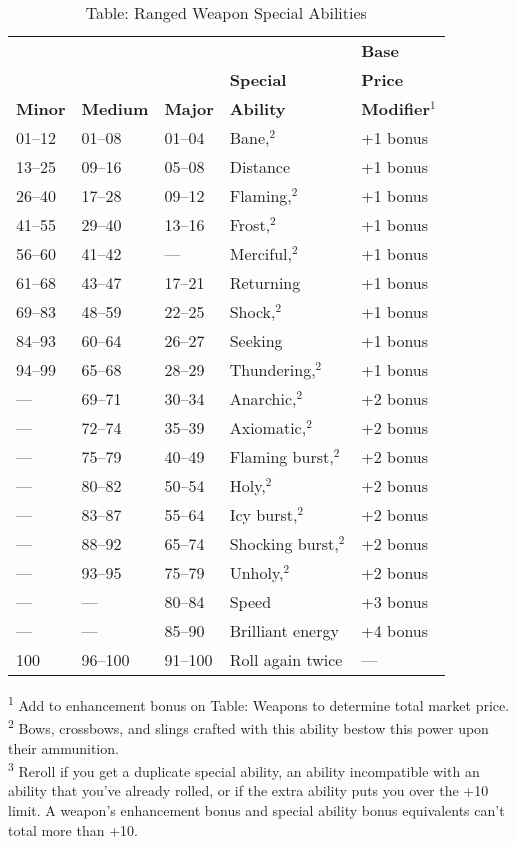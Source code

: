 \begin{table}[]
\sffamily
\caption{Table: Ranged Weapon Special Abilities}
\setlength{\tabcolsep}{1pt}
\begin{tabular}{lllll}
               &                 &                &                  & \textbf{Base} \\
               &                 &                & \textbf{Special} & \textbf{Price} \\
\textbf{Minor} & \textbf{Medium} & \textbf{Major} & \textbf{Ability} & \textbf{Modifier\(^{1}\)}\\
01--12 & 01--08 & 01--04 & Bane,\(^{2}\) & +1 bonus\\
13--25 & 09--16 & 05--08 & Distance & +1 bonus\\
26--40 & 17--28 & 09--12 & Flaming,\(^{2}\) & +1 bonus\\
41--55 & 29--40 & 13--16 & Frost,\(^{2}\) & +1 bonus\\
56--60 & 41--42 & --- & Merciful,\(^{2}\) & +1 bonus\\
61--68 & 43--47 & 17--21 & Returning & +1 bonus\\
69--83 & 48--59 & 22--25 & Shock,\(^{2}\) & +1 bonus\\
84--93 & 60--64 & 26--27 & Seeking & +1 bonus\\
94--99 & 65--68 & 28--29 & Thundering,\(^{2}\) & +1 bonus\\
--- & 69--71 & 30--34 & Anarchic,\(^{2}\) & +2 bonus\\
--- & 72--74 & 35--39 & Axiomatic,\(^{2}\) & +2 bonus\\
--- & 75--79 & 40--49 & Flaming burst,\(^{2}\) & +2 bonus\\
--- & 80--82 & 50--54 & Holy,\(^{2}\) & +2 bonus\\
--- & 83--87 & 55--64 & Icy burst,\(^{2}\) & +2 bonus\\
--- & 88--92 & 65--74 & Shocking burst,\(^{2}\) & +2 bonus\\
--- & 93--95 & 75--79 & Unholy,\(^{2}\) & +2 bonus\\
--- & --- & 80--84 & Speed & +3 bonus\\
--- & --- & 85--90 & Brilliant energy & +4 bonus\\
100 & 96--100 & 91--100 & Roll again twice & ---\\
\end{tabular}
\textsuperscript{1} Add to enhancement bonus on Table: Weapons to determine total market price.\\
\textsuperscript{2} Bows, crossbows, and slings crafted with this ability bestow this power upon their ammunition.\\
\textsuperscript{3} Reroll if you get a duplicate special ability, an ability incompatible with an ability that you've already rolled, or if the extra ability puts you over the +10 limit. A weapon's enhancement bonus and special ability bonus equivalents can't total more than +10.\\
\end{table}
